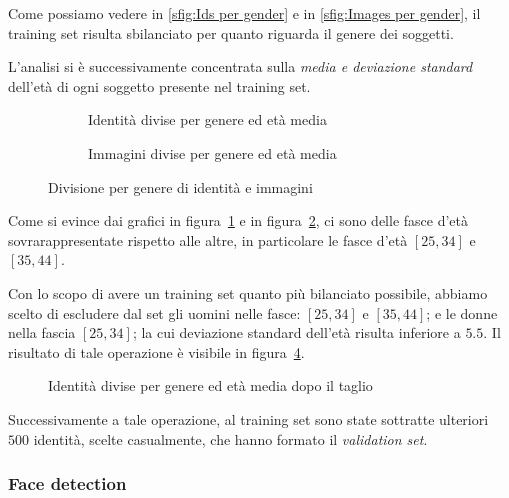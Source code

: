 Come possiamo vedere in \ref{sfig:Ids per gender} e in \ref{sfig:Images per gender}, il training set risulta sbilanciato per quanto riguarda il genere dei soggetti.

L'analisi si è successivamente concentrata sulla \emph{media e deviazione standard} dell'età di ogni soggetto presente nel training set.

\begin{figure}[H]

\begin{subfigure}{0.5\textwidth}
\def\svgscale{0.42}

\caption{Identità divise per genere ed età media}
\label{sfig:Ids per gender and mean age}
\end{subfigure}
\begin{subfigure}{0.5\textwidth}
\def\svgscale{0.42}

\caption{Immagini divise per genere ed età media}
\label{sfig:Images per gender and mean age}
\end{subfigure}
\caption{Divisione per genere di identità e immagini}
\label{fig:gender_age_division}
\end{figure}

Come si evince dai grafici in figura~\ref{sfig:Ids per gender and mean age} e in figura~\ref{sfig:Images per gender and mean age}, ci sono delle fasce d'età sovrarappresentate rispetto alle altre, in particolare le fasce d'età $[25,34]$ e $[35,44]$.

Con lo scopo di avere un training set quanto più bilanciato possibile, abbiamo scelto di escludere dal set gli uomini nelle fasce: $[25,34]$ e $[35,44]$; e le donne nella fascia $[25,34]$; la cui deviazione standard dell'età risulta inferiore a $5.5$. Il risultato di tale operazione è visibile in figura~\ref{fig:Ids per gender and mean age after the drop}.

\begin{figure}[H]
\centering
\def\svgscale{0.7}

\caption{Identità divise per genere ed età media dopo il taglio}
\label{fig:Ids per gender and mean age after the drop}
\end{figure}

Successivamente a tale operazione, al training set sono state sottratte ulteriori $500$ identità, scelte casualmente, che hanno formato il \emph{validation set}.

\subsubsection{Face detection}
\label{subsubsec:face_detection}

